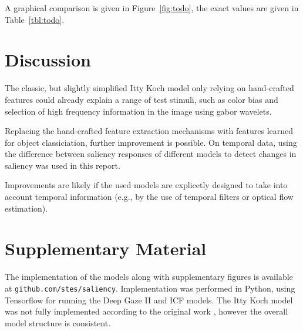 \documentclass[a4paper,twocolumn,10pt]{article}
\begin{document}
A graphical comparison is given in Figure~\ref{fig:todo}, the exact values are given in Table~\ref{tbl:todo}.

\section{Discussion}

The classic, but slightly simplified Itty Koch model only relying on hand-crafted features could already explain a range of test stimuli, such as color bias and selection of high frequency information in the image using gabor wavelets.

Replacing the hand-crafted feature extraction mechanisms with features learned for object classiciation, further improvement is possible.
On temporal data, using the difference between saliency responses of different models to detect changes in saliency was used in this report.

Improvements are likely if the used models are explicetly designed to take into account temporal information (e.g., by the use of temporal filters or optical flow estimation).

\section{Supplementary Material}

The implementation of the models along with supplementary figures is available at \texttt{github.com/stes/saliency}.
Implementation was performed in Python, using Tensorflow for running the Deep Gaze II and ICF \cite{Kummerer2017b} models.
The Itty Koch model was not fully implemented according to the original work \cite{Itti2000}, however the overall model structure is consistent.



\end{document}
